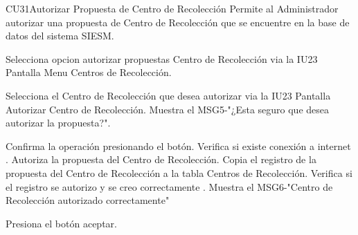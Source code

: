 \begin{UseCase}{CU31}{Autorizar Propuesta de Centro de Recolección}{
		Permite al Administrador autorizar una propuesta de Centro de Recolección que se encuentre en la base de datos del sistema SIESM.\\
}
	
\end{UseCase}



\begin{UCtrayectoria}
	\item\UCactor Selecciona opcion autorizar propuestas Centro de Recolección via la IU23 Pantalla Menu Centros de Recolección.
	\item\UCactor Selecciona el Centro de Recolección que desea autorizar via la IU23 Pantalla Autorizar Centro de Recolección.
	\UCpaso Muestra el MSG5-"¿Esta seguro que desea autorizar la propuesta?".
	\item\UCactor Confirma la operación presionando el botón.
	\UCpaso Verifica si existe conexión a internet .
	\UCpaso Autoriza la propuesta del Centro de Recolección.
	\UCpaso Copia el registro de la propuesta del Centro de Recolección a la tabla Centros de Recolección.
	\UCpaso Verifica si el registro se autorizo y se creo correctamente .
	\UCpaso Muestra el MSG6-"Centro de Recolección autorizado correctamente"
	\item\UCactor Presiona el botón aceptar.
\end{UCtrayectoria}


